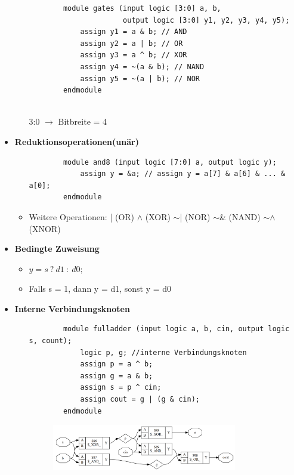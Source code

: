 \documentclass[11pt,a4paper]{article}
\begin{document}
\begin{itemize}
\begin{itemize}
	\item[] 
		\begin{lstlisting}
		module gates (input logic [3:0] a, b,
					  output logic [3:0] y1, y2, y3, y4, y5);
			assign y1 = a & b; // AND
			assign y2 = a | b; // OR
			assign y3 = a ^ b; // XOR
			assign y4 = ~(a & b); // NAND
			assign y5 = ~(a | b); // NOR
		endmodule		
		
		\end{lstlisting}	
		
	\item [3:0] $\rightarrow$ Bitbreite = 4

	\end{itemize}
	
\item \textbf{Reduktionsoperationen(unär)}
	\begin{itemize}
	
	\item[]
		\begin{lstlisting}
		module and8 (input logic [7:0] a, output logic y);
			assign y = &a; // assign y = a[7] & a[6] & ... & a[0];
		endmodule	
		\end{lstlisting}	
		
	\item Weitere Operationen: | (OR)   $\wedge$ (XOR)   $\sim$| (NOR)   $\sim$\& (NAND)   $\sim\wedge$ (XNOR)
	
	\end{itemize}
	
\item \textbf{Bedingte Zuweisung}
	\begin{itemize}
	\item $y = s ~ ? ~ d1~:~d0;$
	\item Falls s = 1, dann y = d1, sonst y = d0
	\end{itemize}

\item \textbf{Interne Verbindungsknoten}
	\begin{itemize}
	\item[]
		\begin{lstlisting}
		module fulladder (input logic a, b, cin, output logic s, count);
			logic p, g; //interne Verbindungsknoten
			assign p = a ^ b;
			assign g = a & b;
			assign s = p ^ cin;
			assign cout = g | (g & cin);
		endmodule
		\end{lstlisting}
		
	\item[] \begin{figure}[H]
				\begin{center}
				\includegraphics[height=2cm]{verbindungsknoten}
				\end{center}
			\end{figure}
	\end{itemize}
	

\end{itemize}
\end{document}
